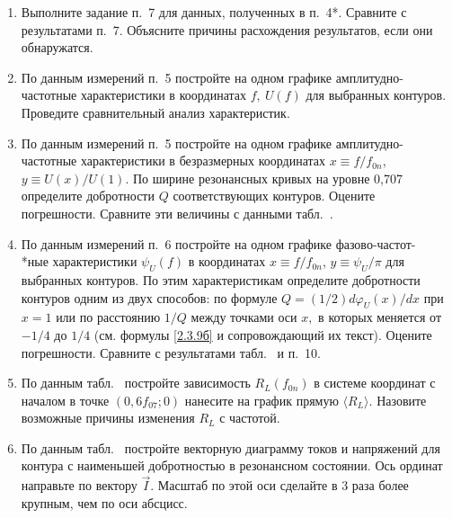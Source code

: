 \begin{lab:task}
\begin{enumerate}
Оцените относительный вклад активных потерь в конденсаторах, представленных в табл.~. сопротивлением $R_{S\text{max}},$ рассчитанным для максимального значения $\tg\delta=10^{-3},$ в суммарное активное сопротивление контура.

\item {} Выполните задание п.~7 для данных, полученных в п.~4*. Сравните с результатами п.~7. Объясните причины расхождения результатов, если они обнаружатся.

\item По данным измерений п.~5 постройте на одном графике амплитудно-частотные характеристики в координатах $f,~U(f)$   для выбранных контуров. Проведите сравнительный анализ характеристик.

\item По данным измерений п.~5 постройте на одном графике амплитудно-частотные характеристики в безразмерных координатах $x\equiv f/f_{0n}$, $y\equiv U(x)/U(1).$ По ширине резонансных кривых на уровне 0,707 определите добротности $Q$ соответствующих контуров. Оцените погрешности. Сравните эти величины с данными табл.~.

\item По данным измерений п.~6 постройте на одном графике фазово-частот-\\*ные характеристики $\psi_U(f)$ в координатах $x\equiv f/f_{0n}$, $y\equiv\psi_U/\pi$ для выбранных контуров. По этим характеристикам определите добротности контуров одним из двух способов: по формуле $Q=(1/2)d\varphi_U(x)/dx$ при $x=1$ или по расстоянию $1/Q$ между точками оси $x,$ в которых  меняется от $-1/4$ до $1/4$ (см. формулы \eqref{2.3.9б} и сопровождающий их текст). Оцените погрешности. Сравните с результатами табл.~ и п.~10.

\item По данным табл.~ постройте зависимость $R_L(f_{0n})$ в системе координат с началом в точке $(0,6f_{07};0)$ нанесите на график прямую $\langle R_L \rangle.$ Назовите возможные причины изменения $R_L$ с частотой.

\item По данным табл.~ постройте векторную диаграмму токов и напряжений для контура с наименьшей добротностью в резонансном состоянии. Ось ординат направьте по вектору $\vec I.$ Масштаб по этой оси  сделайте в 3 раза более крупным, чем по оси абсцисс.
	\end{enumerate}
\end{lab:task}

